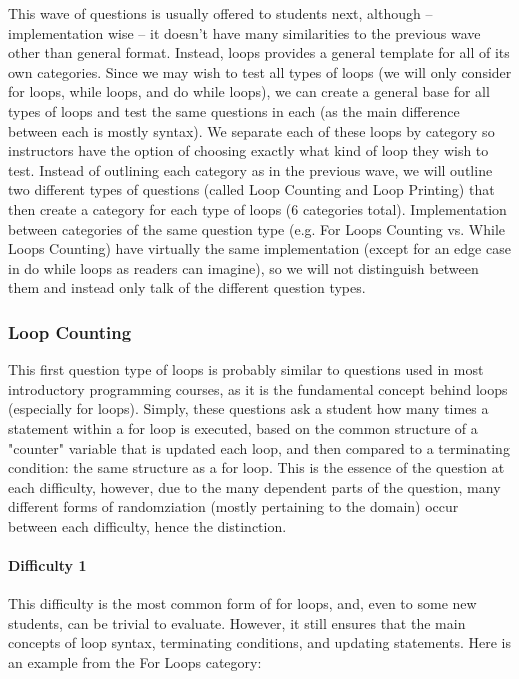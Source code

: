\documentclass{article}
\begin{document}
This wave of questions is usually offered to students next, although -- implementation wise -- it doesn't have many similarities to the previous wave other than general format. Instead, loops provides 
a general template for all of its own categories. Since we may wish to test all types of loops (we will only consider for loops, while loops, and do while loops), we can create a general base for 
all types of loops and test the same questions in each (as the main difference between each is mostly syntax). We separate each of these loops by category so instructors have the option of 
choosing exactly what kind of loop they wish to test. Instead of outlining each category as in the previous wave, we will outline two different types of questions (called Loop Counting and Loop Printing) that then create a category for each type of loops (6 categories total). Implementation between categories of the same question type (e.g. For Loops Counting vs. While Loops Counting) have virtually the same implementation (except for an edge case in do while loops as readers can imagine), so we will not distinguish between them and instead only talk of the different question types.

\subsubsection{Loop Counting}

This first question type of loops is probably similar to questions used in most introductory programming courses, as it is the fundamental concept behind loops (especially for loops). Simply, these
questions ask a student how many times a statement within a for loop is executed, based on the common structure of a "counter" variable that is updated each loop, and then compared to a
terminating condition: the same structure as a for loop. This is the essence of the question at each difficulty, however, due to the many dependent parts of the question, many different forms 
of randomziation (mostly pertaining to the domain) occur between each difficulty, hence the distinction.

\paragraph{Difficulty 1} \hfill \par
This difficulty is the most common form of for loops, and, even to some new students, can be trivial to evaluate. However, it still ensures that the main concepts of loop syntax, terminating 
conditions, and updating statements. Here is an example from the For Loops category:
\end{document}
